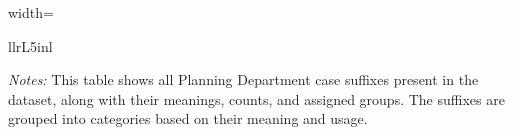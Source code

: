\begin{table}[H]
\begin{adjustbox}{width=\textwidth}
\begin{threeparttable}
\begin{tabular}{llrL{5in}l}
\bottomrule
\end{tabular}
\begin{tablenotes}
\item {\textit{Notes: } This table shows all Planning Department case suffixes present in the dataset, along with their meanings, counts, and assigned groups. The suffixes are grouped into categories based on their meaning and usage.}
\end{tablenotes}
\end{threeparttable}
\end{adjustbox}
\end{table}
